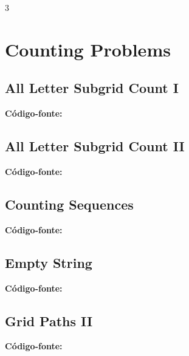 \documentclass[8pt]{extarticle}
\begin{document}
\begin{multicols*}{3}

\section{Counting Problems}

\subsection{All Letter Subgrid Count I}
\begin{caixaenunciado}

\end{caixaenunciado}
\vspace{0.3cm}
\noindent\textbf{Código-fonte:}


\subsection{All Letter Subgrid Count II}
\begin{caixaenunciado}

\end{caixaenunciado}
\vspace{0.3cm}
\noindent\textbf{Código-fonte:}


\subsection{Counting Sequences}
\begin{caixaenunciado}

\end{caixaenunciado}
\vspace{0.3cm}
\noindent\textbf{Código-fonte:}


\subsection{Empty String}
\begin{caixaenunciado}

\end{caixaenunciado}
\vspace{0.3cm}
\noindent\textbf{Código-fonte:}


\subsection{Grid Paths II}
\begin{caixaenunciado}

\end{caixaenunciado}
\vspace{0.3cm}
\noindent\textbf{Código-fonte:}



\end{multicols*}
\end{document}
